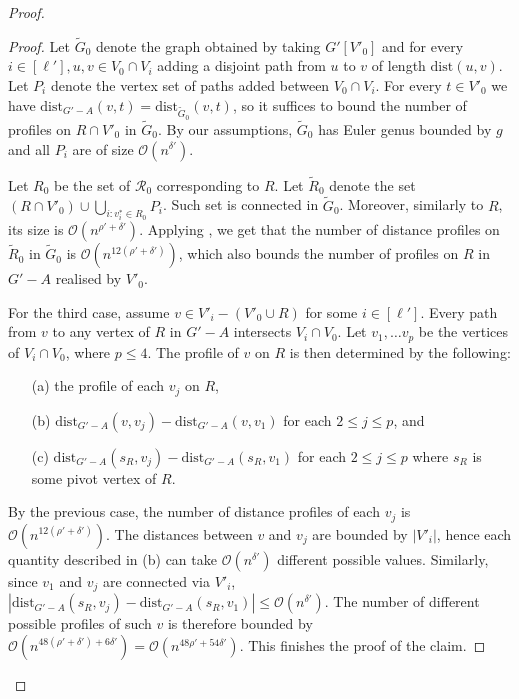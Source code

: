 \documentclass[11pt,a4paper]{article}
\newcommand{\Oh}{\mathcal{O}}
\newcommand{\dist}{\mathrm{dist}}
\renewcommand{\leq}{\leqslant}
\renewcommand{\setminus}{-}
\begin{document}
\begin{proof}
\begin{proof}
Let $\tilde{G}_0$ denote the graph obtained by taking $G'[V'_0]$ and for every $i \in [\ell'], u, v \in V_0 \cap V_i$ adding a disjoint path from $u$ to $v$ of length $\dist(u, v)$. Let $P_i$ denote the vertex set of paths added between $V_0 \cap V_i$. For every $t \in V'_0$ we have $\dist_{G' - A}(v, t) = \dist_{\tilde{G}_0}(v, t)$, so it suffices to bound the number of profiles on $R \cap V'_0$ in $\tilde{G}_0$. By our assumptions, $\tilde{G}_0$ has Euler genus bounded by $g$ and all $P_i$ are of size $\Oh(n^{\delta'})$.

Let $R_0$ be the set of $\mathcal{R}_0$ corresponding to $R$. Let $\tilde{R}_0$ denote the set $(R \cap V'_0) \cup \bigcup_{i : v^*_i \in R_0} P_i$. Such set is connected in $\tilde{G}_0$. Moreover, similarly to $R$, its size is $\Oh(n^{\rho' + \delta'})$. Applying , we get that the number of distance profiles on $\tilde{R}_0$ in $\tilde{G}_0$ is $\Oh(n^{12(\rho' + \delta')})$, which also bounds the number of profiles on $R$ in $G' - A$ realised by $V'_0$.

For the third case, assume $v \in V'_i \setminus (V'_0 \cup R)$ for some $i\in [\ell']$. Every path from $v$ to any vertex of $R$ in $G' - A$ intersects $V_i \cap V_0$. Let $v_1, \dots v_p$ be the vertices of $V_i \cap V_0$, where $p \leq 4$. The profile of $v$ on $R$ is then determined by the following:
\begin{itemize}[nosep]
 \item[(a)] the profile of each $v_j$ on $R$,
 \item[(b)] $\dist_{G' - A}(v, v_j) - \dist_{G' - A}(v, v_1)$ for each $2 \leq j \leq p$, and
 \item[(c)] $\dist_{G' - A}(s_R, v_j) - \dist_{G' - A}(s_R, v_1)$ for each $2 \leq j \leq p$ where $s_R$ is some pivot vertex of $R$.
\end{itemize}
By the previous case, the number of distance profiles of each $v_j$ is $\Oh(n^{12(\rho' + \delta')})$. The distances between $v$ and $v_j$ are bounded by $|V'_i|$, hence each quantity described in (b) can take $\Oh(n^{\delta'})$ different possible values. Similarly, since $v_1$ and $v_j$ are connected via $V'_i$, $|\dist_{G' - A}(s_R, v_j) - \dist_{G' - A}(s_R, v_1)| \leq \Oh(n^{\delta'})$. The number of different possible profiles of such $v$ is therefore bounded by $\Oh(n^{48(\rho' + \delta') + 6\delta'}) = \Oh(n^{48\rho' + 54\delta'})$. This finishes the proof of the claim.
\end{proof}


\end{proof}
\end{document}
